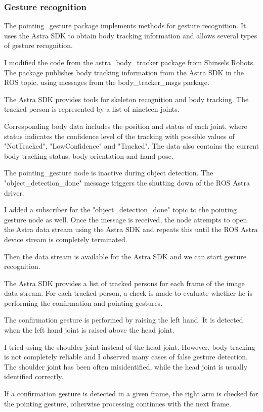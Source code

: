 \subsubsection{Gesture recognition}
The pointing\_gesture package implements methods for gesture recognition. It uses the Astra SDK to obtain body tracking information and allows several types of gesture recognition.\par
I modified the code from the astra\_body\_tracker package from Shinsels Robots. The package publishes body tracking information from the Astra SDK in the ROS topic, using messages from the body\_tracker\_msgs package.\par
The Astra SDK provides tools for skeleton recognition and body tracking. The tracked person is represented by a list of nineteen joints.\par
Corresponding body data includes the position and status of each joint, where status indicates the confidence level of the tracking with possible values of "NotTracked", "LowConfidence" and "Tracked".
The data also contains the current body tracking status, body orientation and hand pose.\par
The pointing\_gesture node is inactive during object detection. 
The "object\_detection\_done" message triggers the shutting down of the ROS Astra driver.\par
I added a subscriber for the "object\_detection\_done" topic to the pointing gesture node as well. Once the message is received, the node attempts to open the Astra data stream using the Astra SDK and repeats this until the ROS Astra device stream is completely terminated.\par
Then the data stream is available for the Astra SDK and we can start gesture recognition.\par 
The Astra SDK provides a list of tracked persons for each frame of the image data stream. For each tracked person, a check is made to evaluate whether he is performing the confirmation and pointing gestures.\par
The confirmation gesture is performed by raising the left hand. It is detected when the left hand joint is raised above the head joint.\par
I tried using the shoulder joint instead of the head joint. However, body tracking is not completely reliable and I observed many cases of false gesture detection. The shoulder joint has been often misidentified, while the head joint is usually identified correctly.\par
If a confirmation gesture is detected in a given frame, the right arm is checked for the pointing gesture, otherwise processing continues with the next frame.\par
